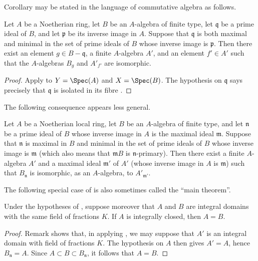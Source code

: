 Corollary  may be stated in the language of
commutative algebra as follows.

\begin{corollary}[4.4.6]
\label{III.4.4.6}
Let $A$ be a Noetherian ring, let $B$ be an $A$-algebra of finite
type, let $\mathfrak q$ be a prime ideal of $B$, and let $\mathfrak p$
be its inverse image in $A$.  Suppose that $\mathfrak q$ is both
maximal and minimal in the set of prime ideals of $B$ whose inverse
image is $\mathfrak p$.  Then there exist an element
$g\in B-\mathfrak q$, a finite $A$-algebra $A'$, and an element
$f'\in A'$ such that the $A$-algebras $B_g$ and $A'_{f'}$ are
isomorphic.
\end{corollary}

\begin{proof}
Apply  to $Y=\Spec(A)$ and $X=\Spec(B)$.  The
hypothesis on $\mathfrak q$ says precisely that $\mathfrak q$ is
isolated in its fibre .
\end{proof}

The following consequence appears less general.


\begin{corollary}[4.4.7]
\label{III.4.4.7}
Let $A$ be a Noetherian local ring, let $B$ be an $A$-algebra of
finite type, and let $\mathfrak n$ be a prime ideal of $B$ whose
inverse image in $A$ is the maximal ideal $\mathfrak m$.  Suppose
that $\mathfrak n$ is maximal in $B$ and minimal in the set of prime
ideals of $B$ whose inverse image is $\mathfrak m$ (which also means
that $\mathfrak mB$ is $\mathfrak n$-primary).  Then there exist a
finite $A$-algebra $A'$ and a maximal ideal $\mathfrak m'$ of $A'$
(whose inverse image in $A$ is $\mathfrak m$) such that $B_{\mathfrak
n}$ is isomorphic, as an $A$-algebra, to $A'_{\mathfrak m'}$.
\end{corollary}

The following special case of  is also sometimes
called the ``main theorem''.

\begin{corollary}[4.4.8]
\label{III.4.4.8}
Under the hypotheses of , suppose moreover that $A$
and $B$ are integral domains with the same field of fractions $K$.
If $A$ is integrally closed, then $A=B$.
\end{corollary}

\begin{proof}
Remark  shows that, in applying
, we may suppose that $A'$ is an integral domain
with field of fractions $K$.  The hypothesis on $A$ then gives
$A'=A$, hence $B_{\mathfrak n}=A$.  Since
$A\subset B\subset B_{\mathfrak n}$, it follows that $A=B$.
\end{proof}

